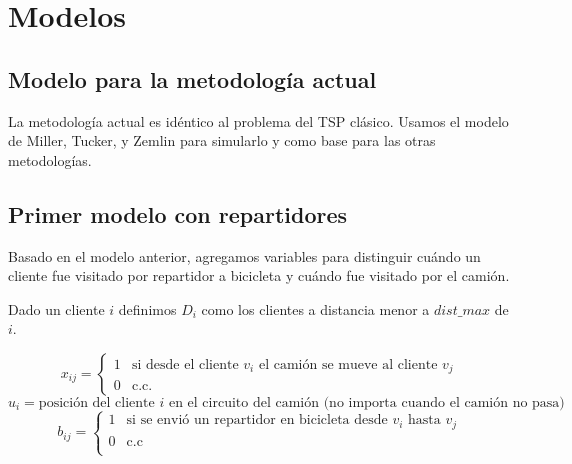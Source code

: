 \documentclass[10pt]{article}
\begin{document}

	\fecha{\today}



	\maketitle

\section{Modelos}



\subsection{Modelo para la metodología actual}

La metodología actual es idéntico al problema del TSP clásico. Usamos el modelo de Miller, Tucker, y Zemlin para simularlo y como base para las otras metodologías.

\subsection{Primer modelo con repartidores}

Basado en el modelo anterior, agregamos variables para distinguir cuándo un cliente fue visitado por repartidor a bicicleta y cuándo fue visitado por el camión.

	\vspace{5mm}

	Dado un cliente $i$ definimos $D_i$ como los clientes a distancia menor a $dist\_max$ de $i$.

	\[
		x_{ij} = \begin{cases}
			1 & \text{si desde el cliente $v_i$ el camión se mueve al cliente $v_j$}\\
			0 & \text{c.c.}
		\end{cases}
	\]
	\[
		u_{i} = \text{posición del cliente $i$ en el circuito del camión (no importa cuando el camión no pasa)}
	\]
	\[
		b_{ij} = \begin{cases}
			1 & \text{si se envió un repartidor en bicicleta desde $v_i$ hasta $v_j$}\\
			0 & \text{c.c}\\
		\end{cases}
	\]
\end{document}
